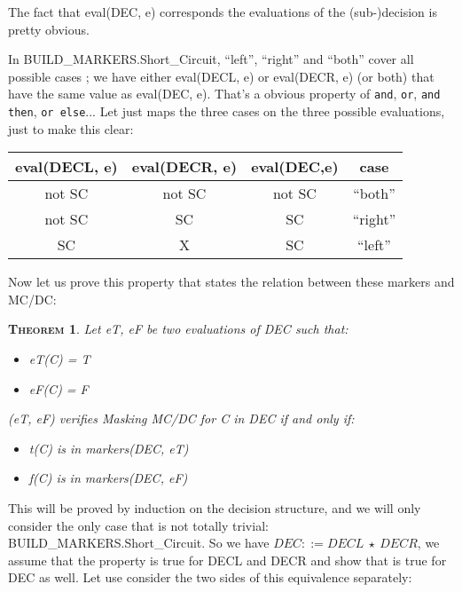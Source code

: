 \documentclass[a4paper,12pt,twoside]{article}
\newcommand{\anysc}{\star}
\newcommand{\andthen}{\texttt{and then}}
\newcommand{\orelse}{\texttt{or else}}
\newcommand{\adaand}{\texttt{and}}
\newcommand{\adaor}{\texttt{or}}
\newtheorem{theorem}{\textsc{Theorem}}
\begin{document}
The fact that eval(DEC, e) corresponds the evaluations of the
(sub-)decision is pretty obvious.

In BUILD\_MARKERS.Short\_Circuit, ``left'', ``right'' and ``both'' cover
all possible cases ; we have either eval(DECL, e) or eval(DECR, e) (or
both) that have the same value as eval(DEC, e). That's a obvious
property of \adaand{}, \adaor{}, \andthen{}, \orelse{}... Let just
maps the three cases on the three possible evaluations, just to make
this clear:
\begin{center}
\begin{tabular}{|c|c||c||c|}
\hline
eval(DECL, e) & eval(DECR, e) & eval(DEC,e) & case\\ \hline
   not SC     &   not SC      &   not SC    & ``both''\\ \hline
   not SC     &     SC        &     SC      & ``right''\\ \hline
     SC       &     X         &     SC      & ``left''\\ \hline
\end{tabular}
\end{center}

Now let us prove this property that states the relation between these
markers and MC/DC:
\begin{theorem}
 \label{thm:masking-markers}
 Let eT, eF be two evaluations of DEC such that:
 \begin{itemize}
  \item eT(C) = T
  \item eF(C) = F
 \end{itemize}
 (eT, eF) verifies Masking MC/DC for C in DEC if and only if:
 \begin{itemize}
  \item t(C) is in markers(DEC, eT)
  \item f(C) is in markers(DEC, eF)
 \end{itemize}
\end{theorem}


This will be proved by induction on the decision structure, and we
will only consider the only case that is not totally trivial:
BUILD\_MARKERS.Short\_Circuit. So we have $DEC ::= DECL \ \anysc{} \ DECR$,
we assume that the property is true for DECL and DECR and show that is true for
DEC as well. Let use consider the two sides of this equivalence
separately:
\end{document}
